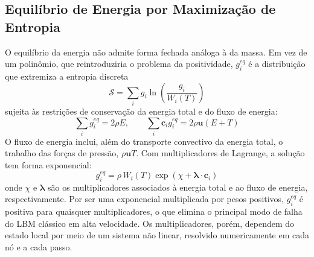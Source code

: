 
\subsection{Equilíbrio de Energia por Maximização de Entropia}\label{subsec:lbm-equilibrio-g}

O equilíbrio da energia não admite forma fechada análoga à da massa.
Em vez de um polinômio, que reintroduziria o problema da positividade, $g_i^{eq}$ é a distribuição que extremiza a entropia discreta
\begin{equation}\label{eq:entropia-discreta}
    \mathcal{S} = \sum_i g_i \ln \left( \frac{g_i}{W_i(T)} \right)
\end{equation}
sujeita às restrições de conservação da energia total e do fluxo de energia:
\begin{equation}\label{eq:restricoes-energia}
    \sum_i g_i^{eq} = 2 \rho E, \qquad \sum_i \mathbf{c}_i g_i^{eq} = 2 \rho \mathbf{u} \left( E + T \right)
\end{equation}
O fluxo de energia inclui, além do transporte convectivo da energia total, o trabalho das forças de pressão, $\rho \mathbf{u} T$.
Com multiplicadores de Lagrange, a solução tem forma exponencial:
\begin{equation}\label{eq:geq-entropico}
    g_i^{eq} = \rho\, W_i(T) \exp \left( \chi + \boldsymbol{\lambda} \cdot \mathbf{c}_i \right)
\end{equation}
onde $\chi$ e $\boldsymbol{\lambda}$ são os multiplicadores associados à energia total e ao fluxo de energia, respectivamente.
Por ser uma exponencial multiplicada por pesos positivos, $g_i^{eq}$ é positiva para quaisquer multiplicadores, o que elimina o principal modo de falha do LBM clássico em alta velocidade.
Os multiplicadores, porém, dependem do estado local por meio de um sistema não linear, resolvido numericamente em cada nó e a cada passo.

